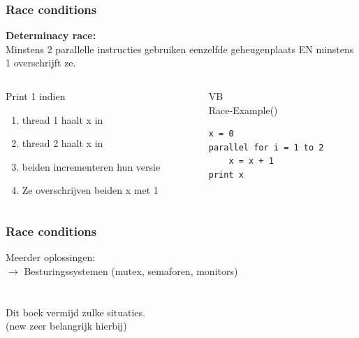 \documentclass
   [kulak] %
   {kulakbeamer}
\begin{document}
\begin{frame}[fragile]
	\frametitle{Race conditions}
	
	\textbf{Determinacy race:}\\
	Minstens 2 parallelle instructies gebruiken eenzelfde geheugenplaats EN minstens 1 overschrijft ze. \\
	
	\pause
	\begin{columns}[T] %
		
		
		
		\begin{column}{.48\textwidth}
			\begin{minipage}[c][.5\textheight][c]{\linewidth}
				
				Print 1 indien
				\begin{enumerate}
					\item thread 1 haalt x in
					\item thread 2 haalt x in
					\item beiden incrementeren hun versie
					\item Ze overschrijven beiden x met 1
				\end{enumerate}
				
			\end{minipage}
		\end{column}
		
		
		
		\begin{column}{.5\textwidth}
			VB\\
			Race-Example()
			\begin{lstlisting}[style=CStyle]
x = 0
parallel for i = 1 to 2
	x = x + 1
print x
			\end{lstlisting}
			
		\end{column}
		
		
		
		
		
	\end{columns}
\end{frame}

\begin{frame}
	\frametitle{Race conditions}
	Meerder oplossingen:
	\\$\rightarrow$ Besturingssystemen (mutex, semaforen, monitors)\\
	~\\~\\
	Dit boek vermijd zulke situaties.
	\\ (new zeer belangrijk hierbij)
\end{frame}
\end{document}
